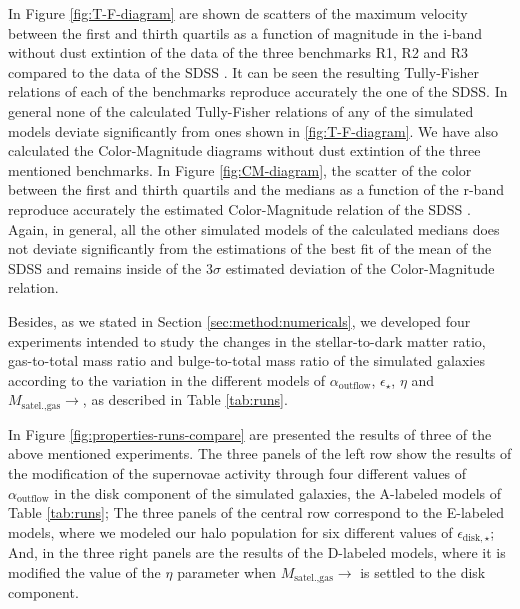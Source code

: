 \documentclass[usenatbib]{mn2e}
\begin{document}
In Figure \ref{fig:T-F-diagram} are shown de scatters of the maximum velocity  between the first and thirth quartils  as a function of magnitude in
 the i-band without dust extintion of the data of the three benchmarks R1, R2 and R3 compared to the data of the SDSS \citep{2007AJ....134..945P}.
 It can be seen the resulting Tully-Fisher relations of each of the benchmarks reproduce accurately the one of the SDSS. In general none of the 
calculated Tully-Fisher relations of any of the simulated models deviate significantly from ones shown in \ref{fig:T-F-diagram}. We have also calculated the
 Color-Magnitude diagrams without dust extintion of the three mentioned benchmarks. In Figure \ref{fig:CM-diagram}, the scatter of the color between the 
first and thirth quartils and the medians as a function of the r-band reproduce accurately the estimated Color-Magnitude relation of the 
SDSS \citep{2012MNRAS.423.1583M}. Again, in general, all the other simulated models of the calculated medians does not deviate significantly from 
the estimations of the best fit of the mean of the SDSS and remains inside of the $3\sigma$ estimated deviation of the Color-Magnitude relation.


Besides, as we stated in Section \ref{sec:method:numericals}, we developed four experiments intended to study the changes in the stellar-to-dark matter ratio, 
gas-to-total mass ratio and bulge-to-total mass ratio of the simulated galaxies according to the variation in the different models of $\alpha_{\text{outflow}}$,
 $\epsilon_\star$, $\eta$ and  $M_{\text{satel.,gas}}\to$, as described in  Table \ref{tab:runs}. 

In Figure \ref{fig:properties-runs-compare} are presented the results of three of the above mentioned experiments. The three panels of the left row show
the results of the modification of the supernovae activity through four different values of $\alpha_{\text{outflow}}$ in the disk component of the 
simulated galaxies, the A-labeled models of Table \ref{tab:runs}; The three panels of the central row correspond to the E-labeled models,
where we modeled our halo population for six different values of $\epsilon_{\text{disk},\star}$; And, in the three right panels are the results of the D-labeled 
models, where it is modified the value of the $\eta$ parameter when $M_{\text{satel.,gas}}\to$ is settled to the disk component. 
\end{document}
